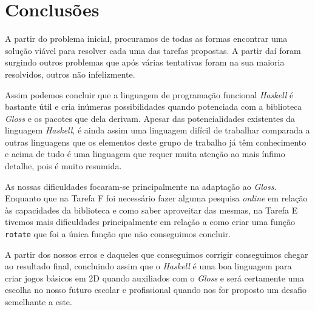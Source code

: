 \documentclass[a4paper,12pt]{report}
\begin{document}
\chapter {Conclusões}

A partir do problema inicial, procuramos de todas as formas encontrar uma solução viável para resolver cada uma das tarefas propostas. A partir daí foram surgindo outros problemas que após várias tentativas foram na sua maioria resolvidos, outros não infelizmente.

Assim podemos concluir que a linguagem de programação funcional {\sl Haskell} é bastante útil e cria inúmeras possibilidades quando potenciada com a biblioteca {\sl Gloss} e os pacotes que dela derivam. Apesar das potencialidades existentes da linguagem {\sl Haskell}, é ainda assim uma linguagem difícil de trabalhar comparada a outras linguagens que os elementos deste grupo de trabalho já têm conhecimento e acima de tudo é uma linguagem que requer muita atenção ao mais ínfimo detalhe, pois é muito resumida.

As nossas dificuldades focaram-se principalmente na adaptação ao {\sl Gloss}. Enquanto que na Tarefa F foi necessário fazer alguma pesquisa {\it online} em relação às capacidades da biblioteca e como saber aproveitar das mesmas, na Tarefa E tivemos mais dificuldades principalmente em relação a como criar uma função {\footnotesize\tt rotate} que foi a única função que não conseguimos concluir.

A partir dos nossos erros e daqueles que conseguimos corrigir conseguimos chegar ao resultado final, concluindo assim que o {\sl Haskell} é uma boa linguagem para criar jogos básicos em 2D quando auxiliados com o {\sl Gloss} e será certamente uma escolha no nosso futuro escolar e profissional quando nos for proposto um desafio semelhante a este.





\lstlistoflistings

\listoffigures
\end{document}
